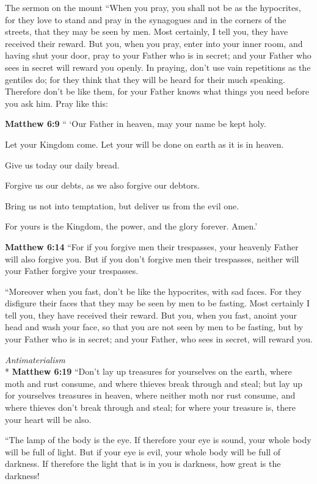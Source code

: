 \documentclass[10pt,a5paper,twoside]{article}
\newcommand{\doimage}[2]{\texttt{[image: \#2]}\label{fig:#2}}
\newcommand{\figbasic}[4]{ %
    \ifthenelse{\isodd{\pageref{fig:#2}}}{}{\hfill}
    \ifstrempty{#3}{
      \doimage{#1}{#2}
    }{
      \makebox{\doimage{#1}{#2} \\ #3}
    }
    \ifthenelse{\isodd{\pageref{fig:#2}}}{\hfill}{}
    \par
}
\newcommand{\fig}[2][0.4]{
  \figbasic{#1}{#2}{}{}
}
\newcommand{\quotesize}{\normalsize{}}
\newenvironment{quotetext}{\begingroup\quotesize}{\endgroup}
\newcommand{\intex}[1]{\index[texts]{#1}}
\newcommand{\bible}[2]{\begin{quotetext}\textbf{#1}\intex{#1} #2\end{quotetext}}
\newcommand{\matthew}[2]{\bible{Matthew #1}{#2}}
\newcommand{\subhead}[1]{\emph{#1}\\*}
\begin{document}
\begin{section}{The sermon on the mount}
{   ``When you pray, you shall not be as the hypocrites, for they love to stand and pray in the synagogues and in the corners of the streets, that they may be seen by men. Most certainly, I tell you, they have received their reward.    But you, when you pray, enter into your inner room, and having shut your door, pray to your Father who is in secret; and your Father who sees in secret will reward you openly.    In praying, don't use vain repetitions as the gentiles do; for they think that they will be heard for their much speaking.    Therefore don't be like them, for your Father knows what things you need before you ask him.    Pray like this:
}

\matthew{6:9}{
`` `Our Father in heaven, may your name be kept holy.

   Let your Kingdom come.
Let your will be done on earth as it is in heaven.

   Give us today our daily bread.

   Forgive us our debts,
as we also forgive our debtors.

   Bring us not into temptation,
but deliver us from the evil one.

For yours is the Kingdom, the power, and the glory forever. Amen.'
}

\matthew{6:14}{
   ``For if you forgive men their trespasses, your heavenly Father will also forgive you.    But if you don't forgive men their trespasses, neither will your Father forgive your trespasses.

   ``Moreover when you fast, don't be like the hypocrites, with sad faces. For they disfigure their faces that they may be seen by men to be fasting. Most certainly I tell you, they have received their reward.    But you, when you fast, anoint your head and wash your face,    so that you are not seen by men to be fasting, but by your Father who is in secret; and your Father, who sees in secret, will reward you.}

\fig{mammon}

\subhead{Antimaterialism}
\matthew{6:19}{
   ``Don't lay up treasures for yourselves on the earth, where moth and rust consume, and where thieves break through and steal;    but lay up for yourselves treasures in heaven, where neither moth nor rust consume, and where thieves don't break through and steal;    for where your treasure is, there your heart will be also.

   ``The lamp of the body is the eye. If therefore your eye is sound, your whole body will be full of light.    But if your eye is evil, your whole body will be full of darkness. If therefore the light that is in you is darkness, how great is the darkness!

}
\end{section}
\end{document}
